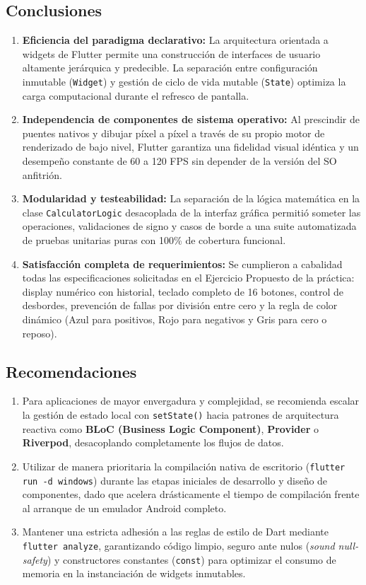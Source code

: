 \documentclass[12pt,a4paper]{article}
\begin{document}
\subsection{Conclusiones}
\begin{enumerate}
    \item \textbf{Eficiencia del paradigma declarativo:} La arquitectura orientada a widgets de Flutter permite una construcción de interfaces de usuario altamente jerárquica y predecible. La separación entre configuración inmutable (\texttt{Widget}) y gestión de ciclo de vida mutable (\texttt{State}) optimiza la carga computacional durante el refresco de pantalla.
    \item \textbf{Independencia de componentes de sistema operativo:} Al prescindir de puentes nativos y dibujar píxel a píxel a través de su propio motor de renderizado de bajo nivel, Flutter garantiza una fidelidad visual idéntica y un desempeño constante de 60 a 120 FPS sin depender de la versión del SO anfitrión.
    \item \textbf{Modularidad y testeabilidad:} La separación de la lógica matemática en la clase \texttt{CalculatorLogic} desacoplada de la interfaz gráfica permitió someter las operaciones, validaciones de signo y casos de borde a una suite automatizada de pruebas unitarias puras con 100\% de cobertura funcional.
    \item \textbf{Satisfacción completa de requerimientos:} Se cumplieron a cabalidad todas las especificaciones solicitadas en el Ejercicio Propuesto de la práctica: display numérico con historial, teclado completo de 16 botones, control de desbordes, prevención de fallas por división entre cero y la regla de color dinámico (Azul para positivos, Rojo para negativos y Gris para cero o reposo).
\end{enumerate}

\subsection{Recomendaciones}
\begin{enumerate}
    \item Para aplicaciones de mayor envergadura y complejidad, se recomienda escalar la gestión de estado local con \texttt{setState()} hacia patrones de arquitectura reactiva como \textbf{BLoC (Business Logic Component)}, \textbf{Provider} o \textbf{Riverpod}, desacoplando completamente los flujos de datos.
    \item Utilizar de manera prioritaria la compilación nativa de escritorio (\texttt{flutter run -d windows}) durante las etapas iniciales de desarrollo y diseño de componentes, dado que acelera drásticamente el tiempo de compilación frente al arranque de un emulador Android completo.
    \item Mantener una estricta adhesión a las reglas de estilo de Dart mediante \texttt{flutter analyze}, garantizando código limpio, seguro ante nulos (\textit{sound null-safety}) y constructores constantes (\texttt{const}) para optimizar el consumo de memoria en la instanciación de widgets inmutables.
\end{enumerate}
\end{document}
